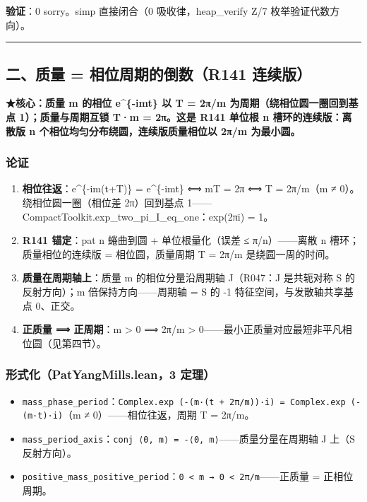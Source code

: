\documentclass[
]{article}
\providecommand{\tightlist}{%
  \setlength{\itemsep}{0pt}\setlength{\parskip}{0pt}}
\begin{document}
\textbf{验证}：0 sorry。simp 直接闭合（0 吸收律，heap\_verify Z/7
枚举验证代数方向）。

\begin{center}\rule{0.5\linewidth}{0.5pt}\end{center}

\subsection{二、质量 = 相位周期的倒数（R141
连续版）}\label{ux4e8cux8d28ux91cf-ux76f8ux4f4dux5468ux671fux7684ux5012ux6570r141-ux8fdeux7eedux7248}

\textbf{★核心：质量 m 的相位 e\^{}\{-imt\} 以 T = 2π/m
为周期（绕相位圆一圈回到基点 1）；质量与周期互锁 T·m = 2π。这是 R141
单位根 n 槽环的连续版：离散版 n 个相位均匀分布绕圆，连续版质量相位以
2π/m 为最小圆。}

\subsubsection{论证}\label{ux8bbaux8bc1-1}

\begin{enumerate}
\def\labelenumi{\arabic{enumi}.}
\tightlist
\item
  \textbf{相位往返}：e\^{}\{-im(t+T)\} = e\^{}\{-imt\} ⟺ mT = 2π ⟺ T =
  2π/m（m ≠ 0）。绕相位圆一圈（相位差 2π）回到基点
  1------CompactToolkit.exp\_two\_pi\_I\_eq\_one：exp(2πi) = 1。
\item
  \textbf{R141 锚定}：pat n 蜷曲到圆 + 单位根量化（误差 ≤
  π/n）------离散 n 槽环；质量相位的连续版 = 相位圆，质量周期 T = 2π/m
  是绕圆一周的时间。
\item
  \textbf{质量在周期轴上}：质量 m 的相位分量沿周期轴 J（R047：J
  是共轭对称 S 的反射方向）；m 倍保持方向------周期轴 = S 的 -1
  特征空间，与发散轴共享基点 0、正交。
\item
  \textbf{正质量 ⟹ 正周期}：m \textgreater{} 0 ⟹ 2π/m \textgreater{}
  0------最小正质量对应最短非平凡相位圆（见第四节）。
\end{enumerate}

\subsubsection{形式化（PatYangMills.lean，3
定理）}\label{ux5f62ux5f0fux5316patyangmills.lean3-ux5b9aux7406}

\begin{itemize}
\tightlist
\item
  \texttt{mass\_phase\_period}：\texttt{Complex.exp\ (-(m·(t\ +\ 2π/m))·i)\ =\ Complex.exp\ (-(m·t)·i)}（m
  ≠ 0）------相位往返，周期 T = 2π/m。
\item
  \texttt{mass\_period\_axis}：\texttt{conj\ ⟨0,\ m⟩\ =\ -⟨0,\ m⟩}------质量分量在周期轴
  J 上（S 反射方向）。
\item
  \texttt{positive\_mass\_positive\_period}：\texttt{0\ \textless{}\ m\ →\ 0\ \textless{}\ 2π/m}------正质量
  = 正相位周期。
\end{itemize}
\end{document}
